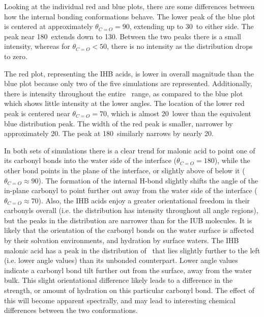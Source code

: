 Looking at the individual red and blue plots, there are some differences between how the internal bonding conformations behave. The lower peak of the blue plot is centered at approximately $\theta_{C=O}=90$\degr, extending up to 30\degr~to either side. The peak near 180\degr~extends down to 130\degr. Between the two peaks there is a small intensity, whereas for $\theta_{C=O} < 50$\degr, there is no intensity as the distribution drops to zero. 

The red plot, representing the IHB acids, is lower in overall magnitude than the blue plot because only two of the five simulations are represented. Additionally, there is intensity throughout the entire \thetacarb~range, as compared to the blue plot which shows little intensity at the lower angles. The location of the lower red peak is centered near $\theta_{C=O}=70$\degr, which is almost 20\degr~lower than the equivalent blue distribution peak. The width of the red peak is smaller, narrower by approximately 20\degr. The peak at 180\degr~similarly narrows by nearly 20\degr.

In both sets of simulations there is a clear trend for malonic acid to point one of its carbonyl bonds into the water side of the interface ($\theta_{C=O}=180$\degr), while the other bond points in the plane of the interface, or slightly above of below it ($\theta_{C=O} \approx 90$\degr). The formation of the internal H-bond slightly shifts the angle of the in-plane carbonyl to point further out away from the water side of the interface ($\theta_{C=O} \approx 70$\degr). Also, the IHB acids enjoy a greater orientational freedom in their carbonyls overall (i.e. the distribution has intensity throughout all angle regions), but the peaks in the distribution are narrower than for the IUB molecules. It is likely that the orientation of the carbonyl bonds on the water surface is affected by their solvation environments, and hydration by surface waters. The IHB malonic acid has a peak in the distribution of \thetacarb~that lies slightly further to the left (i.e. lower angle values) than its unbonded counterpart. Lower angle values indicate a carbonyl bond tilt further out from the surface, away from the water bulk. This slight orientational difference likely leads to a difference in the strength, or amount of hydration on this particular carbonyl bond. The effect of this will become apparent spectrally, and may lead to interesting chemical differences between the two conformations.
